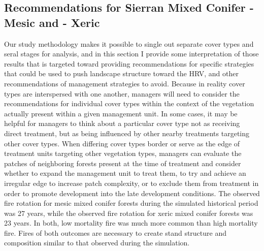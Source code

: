\subsection{Recommendations for Sierran Mixed Conifer - Mesic and - Xeric}
Our study methodology makes it possible to single out separate cover types and seral stages for analysis, and in this section I provide some interpretation of those results that is targeted toward providing recommendations for specific strategies that could be used to push landscape structure toward the HRV, and other recommendations of management strategies to avoid. Because in reality cover types are interspersed with one another, managers will need to consider the recommendations for individual cover types within the context of the vegetation actually present within a given management unit. In some cases, it may be helpful for managers to think about a particular cover type not as receiving direct treatment, but as being influenced by other nearby treatments targeting other cover types. When differing cover types border or serve as the edge of treatment units targeting other vegetation types, managers can evaluate the patches of neighboring forests present at the time of treatment and consider whether to expand the management unit to treat them, to try and achieve an irregular edge to increase patch complexity, or to exclude them from treatment in order to promote development into the late development conditions.                                                                                                                                           The observed fire rotation for mesic mixed conifer forests during the simulated historical period was 27 years, while the observed fire rotation for xeric mixed conifer forests was 23 years. In both, low mortality fire was much more common than high mortality fire. Fires of both outcomes are necessary to create stand structure and composition similar to that observed during the simulation. 

